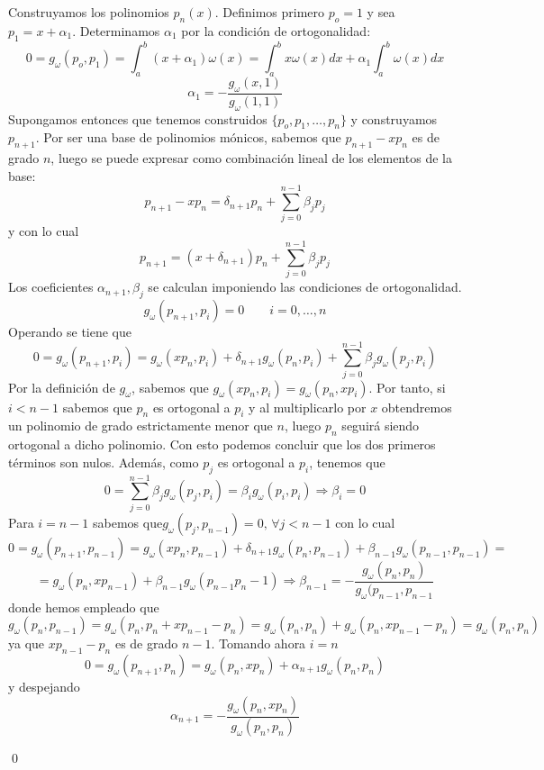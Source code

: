 \begin{dem}
Construyamos los polinomios $p_n(x)$. Definimos primero $p_o=1$ y sea \newline $p_1=x+\alpha_1$. Determinamos $\alpha_1$ por la condición de ortogonalidad:
$$0=g_{\omega}(p_o,p_1)=\int_a^b(x+\alpha_1)\omega(x)=\int_a^bx\omega(x)dx+\alpha_1\int_a^b\omega(x)dx$$
$$\alpha_1=-\dfrac{g_{\omega}(x,1)}{g_{\omega}(1,1)}$$
Supongamos entonces que tenemos construidos $\{p_o,p_1,\ldots,p_n\}$ y construyamos $p_{n+1}$. Por ser una base de polinomios mónicos, sabemos que $p_{n+1}-xp_n$ es de grado $n$, luego se puede expresar como combinación lineal de los elementos de la base:
$$p_{n+1}-xp_n=\delta_{n+1}p_n+\sum_{j=0}^{n-1}\beta_jp_j$$
y con lo cual
$$p_{n+1}=(x+\delta_{n+1})p_n+\sum_{j=0}^{n-1}\beta_jp_j$$
Los coeficientes $\alpha_{n+1},\beta_j$ se calculan imponiendo las condiciones de ortogonalidad.
$$g_{\omega}(p_{n+1},p_i)=0\qquad i=0,\ldots,n$$
Operando se tiene que
$$0=g_{\omega}(p_{n+1},p_i)=g_{\omega}(xp_n,p_i)+\delta_{n+1}g_{\omega}(p_n,p_i)+\sum_{j=0}^{n-1}\beta_jg_{\omega}(p_j,p_i)$$
Por la definición de $g_{\omega}$, sabemos que $g_{\omega}(xp_n,p_i)=g_{\omega}(p_n,xp_i)$. Por tanto, si $i<n-1$ sabemos que $p_n$ es ortogonal a $p_i$ y al multiplicarlo por $x$ obtendremos un polinomio de grado estrictamente menor que $n$, luego $p_n$ seguirá siendo ortogonal a dicho polinomio. Con esto podemos concluir que los dos primeros términos son nulos. Además, como $p_j$ es ortogonal a $p_i$, tenemos que
$$0=\sum_{j=0}^{n-1}\beta_jg_{\omega}(p_j,p_i)=\beta_ig_{\omega}(p_i,p_i)\Rightarrow \beta_i=0$$
Para $i=n-1$ sabemos que$g_{\omega}(p_j,p_{n-1})=0,\, \forall j<n-1$ con lo cual
$$0=g_{\omega}(p_{n+1},p_{n-1})=g_\omega(xp_n,p_{n-1})+\delta_{n+1}g_{\omega}(p_n,p_{n-1})+\beta_{n-1}g_{\omega}(p_{n-1},p_{n-1})=$$
$$=g_{\omega}(p_n,xp_{n-1})+\beta_{n-1}g_{\omega}(p_{n-1}p_n-1)\Rightarrow\beta_{n-1}=-\dfrac{g_{\omega}(p_n,p_n)}{g_{\omega}(p_{n-1},p_{n-1}}$$
donde hemos empleado que
$$g_{\omega}(p_{n},p_{n-1})=g_{\omega}(p_n,p_n+xp_{n-1}-p_n)=g_{\omega}(p_n,p_n)+g_{\omega}(p_n,xp_{n-1}-p_n)=g_{\omega}(p_n,p_n)$$
ya que $xp_{n-1}-p_n$ es de grado $n-1$. 
Tomando ahora $i=n$ 
$$0=g_{\omega}(p_{n+1},p_n)=g_{\omega}(p_n,xp_n)+\alpha_{n+1}g_{\omega}(p_n,p_n)$$
y despejando
$$\alpha_{n+1}=-\dfrac{g_{\omega}(p_n,xp_n)}{g_{\omega}(p_n,p_n)}$$
    
\qed\end{dem}


